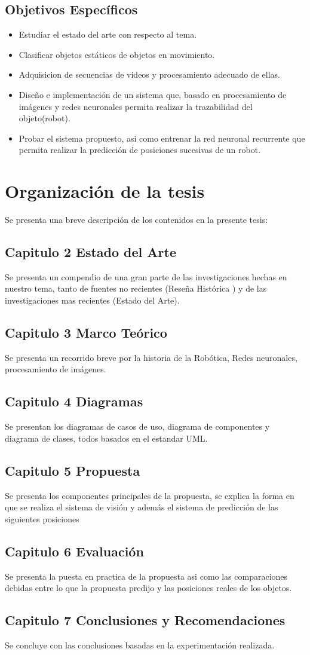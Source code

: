 \subsection{Objetivos Espec\'ificos}
\begin{itemize}
\item Estudiar el estado del arte con respecto al tema.
\item Clasificar objetos est\'aticos de objetos en movimiento.
\item Adquisicion de secuencias de videos y procesamiento adecuado de ellas.
\item Dise\~no e implementaci\'on de un sistema que, basado en procesamiento de im\'agenes y redes neuronales permita realizar la trazabilidad del objeto(robot).
\item Probar el sistema propuesto, asi como entrenar la red neuronal recurrente que permita realizar la predicci\'on de posiciones sucesivas de un robot.
\end{itemize}

\section{Organizaci\'on de la tesis}
Se presenta una breve descripci\'on  de los contenidos en la presente tesis:
\subsection{Capitulo 2 Estado del Arte}
Se presenta un compendio de una gran parte de las investigaciones hechas en nuestro tema, tanto de fuentes no recientes (Rese\~na Hist\'orica ) y de las investigaciones mas recientes (Estado del Arte).
\subsection{Capitulo 3 Marco Te\'orico}
Se presenta un recorrido breve por la historia de la Rob\'otica, Redes neuronales, procesamiento de im\'agenes.
\subsection{Capitulo 4 Diagramas}
Se presentan los diagramas de casos de uso, diagrama de componentes y diagrama de clases, todos basados en el estandar UML.
\subsection{Capitulo 5 Propuesta}
Se presenta los componentes principales de la propuesta, se explica la forma en que se realiza el sistema de visi\'on y adem\'as el sistema de predicci\'on de las siguientes posiciones
\subsection{Capitulo 6 Evaluaci\'on}
Se presenta la puesta en practica de la propuesta asi como las comparaciones debidas entre lo que la propuesta predijo y las posiciones reales de los objetos.
\subsection{Capitulo 7 Conclusiones y Recomendaciones}
Se concluye con las conclusiones basadas en la experimentaci\'on realizada.